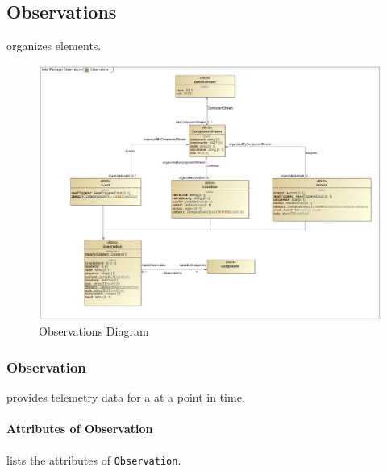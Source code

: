 \subsection{Observations} \label{sec:Observations}


 \glspl{organize}  elements.

\begin{figure}[ht]
  \centering
    \includegraphics[width=1.0\textwidth]{figures/Observations.png}
  \caption{Observations Diagram}
  \label{fig:Observations}
\end{figure}

\FloatBarrier



\subsubsection{Observation}
\label{sec:Observation}



 provides telemetry data for a  at a point in time.


\paragraph{Attributes of Observation}\mbox{}
\label{sec:Attributes of Observation}

 lists the attributes of \texttt{Observation}.

